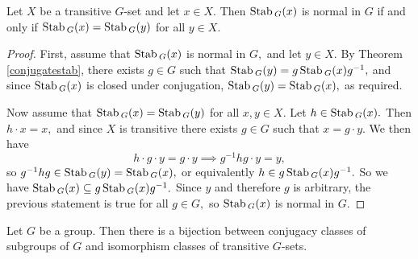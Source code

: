 \begin{corollary}
    Let $X$ be a transitive $G$-set and let $x \in X$. Then $\operatorname*{Stab}{}_G(x)$ is normal in $G$ if and only if $\operatorname*{Stab}{}_G(x)=\operatorname*{Stab}{}_G(y)$ for all $y\in X.$
\end{corollary}
\begin{proof}
    First, assume that $\operatorname*{Stab}{}_G(x)$ is normal in $G,$ and let $y\in X.$ By Theorem \ref{conjugatestab}, there exists $g\in G$ such that $\operatorname*{Stab}{}_G(y)=g\operatorname*{Stab}{}_G(x)g^{-1},$ and since $\operatorname*{Stab}{}_G(x)$ is closed under conjugation, $\operatorname*{Stab}{}_G(y)=\operatorname*{Stab}{}_G(x),$ as required.

Now assume that $\operatorname*{Stab}{}_G(x)=\operatorname*{Stab}{}_G(y)$ for all $x,y\in X.$ Let $h\in \operatorname*{Stab}{}_G(x).$ Then $h\cdot x=x,$ and since $X$ is transitive there exists $g\in G$ such that $x=g\cdot y.$
We then have $$h\cdot g\cdot y=g\cdot y\implies g^{-1}hg\cdot y=y,$$ so $g^{-1}hg\in \operatorname*{Stab}{}_G(y)=\operatorname*{Stab}{}_G(x),$ or equivalently $h\in g\operatorname*{Stab}{}_G(x)g^{-1}.$ So we have $\operatorname*{Stab}{}_G(x)\subseteq g\operatorname*{Stab}{}_G(x)g^{-1}.$ Since $y$ and therefore $g$ is arbitrary, the previous statement is true for all $g\in G,$ so $\operatorname*{Stab}{}_G(x)$ is normal in $G.$
\end{proof}








\begin{theorem}
  Let $G$ be a group. Then there is a bijection between conjugacy classes of subgroups of
  $G$ and isomorphism classes of transitive $G$-sets.
  \label{<+label+>}
\end{theorem}

   
